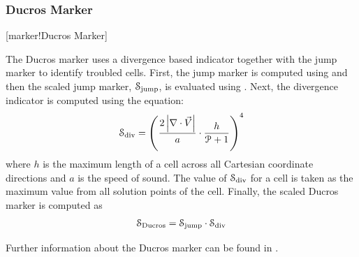 \subsubsection{Ducros Marker}
\label{SEC:DucrosMarker}
\key*{}[marker!Ducros Marker]


The Ducros marker uses a divergence based indicator together with the jump
marker to identify troubled cells.
%
First, the jump marker is computed using
 and then the scaled jump marker,
$\scaledmarker_{\textrm{jump}}$, is evaluated using
.
%
Next, the divergence indicator is computed using the equation:
%
\begin{equation}
  \scaledmarker_{\textrm{div}} = \left(
                                 \frac{2 \left|\nabla\cdot\vec{V}\right|}{a}
                                 \cdot
                                 \frac{h}{\p[+1]{}}
                                 \right)^4
\end{equation}
%
where $h$ is the maximum length of a cell across all Cartesian coordinate
directions and $a$ is the speed of sound.
%
The value of $\scaledmarker_{\textrm{div}}$ for a cell is taken as the maximum
value from all solution points of the cell.
%
Finally, the scaled Ducros marker is computed as
%
\begin{equation}
  \scaledmarker_{\textrm{Ducros}} = \scaledmarker_{\textrm{jump}} \cdot
                                    \scaledmarker_{\textrm{div}}
\end{equation}


Further information about the Ducros marker can be found in
.





